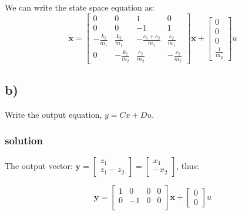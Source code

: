 We can write the state space equation as:
\begin{equation}
    \dot{\textbf{x}} =
        \begin{bmatrix}
        0                & 0                & 1                    & 0 \\
        0                & 0                & -1                   & 1 \\ 
        -\frac{k_1}{m_1} & \frac{k_2}{m_1}  & -\frac{c_1+c_2}{m_1} & \frac{c_2}{m_1}  \\ 
        0                & -\frac{k_2}{m_2} & \frac{c_2}{m_2}      & -\frac{c_2}{m_2}
    \end{bmatrix}
    \textbf{x} + 
    \begin{bmatrix}
        0\\
        0\\ 
        0\\ 
        \frac{1}{m_2}
    \end{bmatrix}
    u
\end{equation}

\subsection{b)}
Write the output equation, $y = Cx + Du$.
\subsubsection{solution}
The output vector: $\textbf{y} = 
\begin{bmatrix}
    z_1\\
    z_1 - z_2
\end{bmatrix} = 
\begin{bmatrix}
    x_1\\
    - x_2
\end{bmatrix}$, thus: 

\begin{equation}
    \dot{\textbf{y}} =
        \begin{bmatrix}
        1 & 0  & 0 & 0 \\
        0 & -1 & 0 & 0 \\ 
    \end{bmatrix}
    \textbf{x} + 
    \begin{bmatrix}
        0\\
        0
    \end{bmatrix}
    u
\end{equation}

\pagebreak